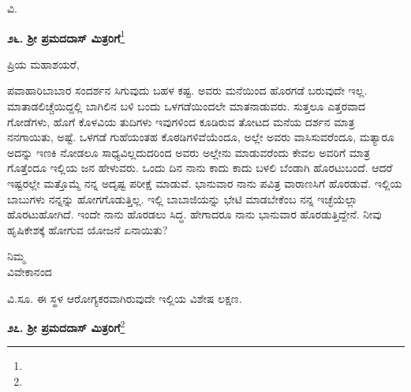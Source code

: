 \vspace{-0.45cm}

{\flushright
ವಿ.\par}

\vfill\eject

\begin{center}
\textbf{೨೬. ಶ‍್ರೀ ಪ್ರಮದದಾಸ್ ಮಿತ್ರರಿಗೆ}\footnote{}
\end{center}

\vspace{-0.5cm}

\begin{flushright}
{\fontsize{11pt}{10pt}\selectfont{ಘಾಜೀಪುರ\\[-2pt] ೩೧ನೇ ಜನವರಿ ೧೮೯೦}}
\end{flushright}

\noindent
ಪ್ರಿಯ ಮಹಾಶಯರೆ,

ಪವಾಹಾರಿಬಾಬಾರ ಸಂದರ್ಶನ ಸಿಗುವುದು ಬಹಳ ಕಷ್ಟ. ಅವರು ಮನೆಯಿಂದ ಹೊರಗಡೆ ಬರುವುದೇ ಇಲ್ಲ. ಮಾತಾಡಲಿಚ್ಚೆಯಿದ್ದಲ್ಲಿ ಬಾಗಿಲಿನ ಬಳಿ ಬಂದು ಒಳಗಡೆಯಿಂದಲೇ ಮಾತನಾಡುವರು. ಸುತ್ತಲೂ ಎತ್ತರವಾದ ಗೋಡೆಗಳು, ಹೊಗೆ ಕೊಳವಿಯ ತುದಿಗಳು ಇವುಗಳಿಂದ ಕೂಡಿರುವ ತೋಟದ ಮನೆಯ ದರ್ಶನ ಮಾತ್ರ ನನಗಾಯಿತು, ಅಷ್ಟೆ. ಒಳಗಡೆ ಗುಹೆಯಂತಹ ಕೊಠಡಿಗಳಿವೆಯೆಂದೂ, ಅಲ್ಲೇ ಅವರು ವಾಸಿಸುವರೆಂದೂ, ಮತ್ಯಾರೂ ಅದನ್ನು ಇಣಕಿ ನೋಡಲೂ ಸಾಧ್ಯವಿಲ್ಲದುದರಿಂದ ಅವರು ಅಲ್ಲೇನು ಮಾಡುವರೆಂದು ಕೇವಲ ಅವರಿಗೆ ಮಾತ್ರ ಗೊತ್ತೆಂದೂ ಇಲ್ಲಿಯ ಜನ ಹೇಳುವರು. ಒಂದು ದಿನ ನಾನು ಕಾದು ಕಾದು ಬಳಲಿ ಬೆಂಡಾಗಿ ಹೊರಟುಬಂದೆ. ಆದರೆ ಇಷ್ಟರಲ್ಲೇ ಮತ್ತೊಮ್ಮೆ ನನ್ನ ಅದೃಷ್ಟ ಪರೀಕ್ಷೆ ಮಾಡುವೆ. ಭಾನುವಾರ ನಾನು ಪವಿತ್ರ ವಾರಾಣಸಿಗೆ ಹೊರಡುವೆ. ಇಲ್ಲಿಯ ಬಾಬುಗಳು ನನ್ನನ್ನು ಹೋಗಗೊಡುತ್ತಿಲ್ಲ. ಇಲ್ಲಿ ಬಾಬಾಜಿಯನ್ನು ಭೇಟಿ ಮಾಡಬೇಕೆಂಬ ನನ್ನ ಇಚ್ಛೆಯೆಲ್ಲಾ ಹೊರಟುಹೋಗಿದೆ. ಇಂದೇ ನಾನು ಹೊರಡಲು ಸಿದ್ಧ. ಹೇಗಾದರೂ ನಾನು ಭಾನುವಾರ ಹೊರಡುತ್ತಿದ್ದೇನೆ. ನೀವು ಹೃಷಿಕೇಶಕ್ಕೆ ಹೋಗುವ ಯೋಜನೆ ಏನಾಯಿತು?

\vspace{-0.5cm}

{\flushright
ನಿಮ್ಮ\\ವಿವೇಕಾನಂದ\par}

ವಿ.ಸೂ. \enginline{-}ಈ ಸ್ಥಳ ಆರೋಗ್ಯಕರವಾಗಿರುವುದೇ ಇಲ್ಲಿಯ ವಿಶೇಷ ಲಕ್ಷಣ.

\vspace{-0.3cm}

\begin{center}
\textbf{೨೭. ಶ‍್ರೀ ಪ್ರಮದದಾಸ್ ಮಿತ್ರರಿಗೆ}\footnote{}
\end{center}

\vspace{-0.55cm}

\begin{flushright}
{\fontsize{11pt}{10pt}\selectfont{ಘಾಜೀಪುರ\\[-2pt] ೪ನೇ ಫೆಬ್ರವರಿ ೧೮೯೦}}
\end{flushright}

